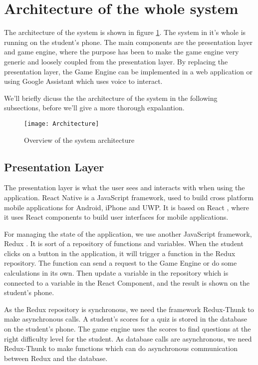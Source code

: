 \section{Architecture of the whole system}
The architecture of the system is shown in figure \ref{fig:Architecture}. The system in it's whole is running on the student's phone. The main components are the presentation layer and game engine, where the purpose has been to make the game engine very generic and loosely coupled from the presentation layer. By replacing the presentation layer, the Game Engine can be implemented in a web application or using Google Assistant which uses voice to interact. 

We'll briefly dicuss the the architecture of the system in the following subsections, before we'll give a more thorough expalantion.

\begin{figure}[h!]
	\texttt{[image: Architecture]}
	\caption {Overview of the system architecture}
	\label{fig:Architecture}
\end{figure}

\subsection{Presentation Layer}
The presentation layer is what the user sees and interacts with when using the application. React Native \parencite{ReactNative} is a JavaScript framework, used to build cross platform mobile applications for Android, iPhone and UWP. It is based on React \parencite{React}, where it uses React components to build user interfaces for mobile applications. 

For managing the state of the application, we use another JavaScript framework, Redux \parencite{Redux}. It is sort of a repository of functions and variables. When the student clicks on a button in the application, it will trigger a function in the Redux repository. The function can send a request to the Game Engine or do some calculations in its own. Then update a variable in the repository which is connected to a variable in the React Component, and the result is shown on the student's phone.

As the Redux repository is synchronous, we need the framework Redux-Thunk \parencite{ReduxJS-thunk} to make asynchronous calls. A student's scores for a quiz is stored in the database on the student's phone. The game engine uses the scores to find questions at the right difficulty level for the student. As database calls are asynchronous, we need Redux-Thunk to make functions which can do asynchronous communication between Redux and the database. 

